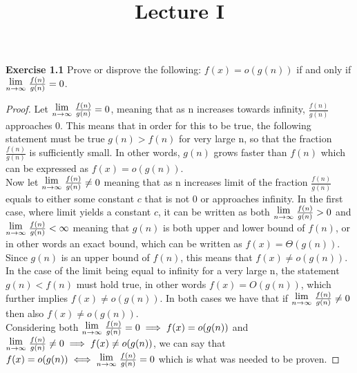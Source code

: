 \documentclass[a4paper]{article}
\title{\vspace{-2cm}Lecture I\vspace{-2cm}}
\date{}
\newcommand{\Lim}[1]{\raisebox{0.5ex}{{$\displaystyle \lim_{#1}\;$}}}
\begin{document}
\maketitle
\noindent \textbf{Exercise 1.1} Prove or disprove the following: $f(x) = o(g(n))$ if and only if $\Lim{n \to \infty} \frac{f(n)}{g(n)}=0$.
\begin{proof}
Let $\Lim{n \to \infty} \frac{f(n)}{g(n)}=0$, meaning that as n increases towards infinity, $\frac{f(n)}{g(n)}$ approaches 0. This means that in order for this to be true, the following statement must be true $g(n) > f(n)$ for very large n, so that the fraction $\frac{f(n)}{g(n)}$ is sufficiently small. In other words, $g(n)$ grows faster than $f(n)$ which can be expressed as $f(x) = o(g(n))$. \\
  
Now let $\Lim{n \to \infty} \frac{f(n)}{g(n)}\neq0$ meaning that as n increases limit of the fraction $\frac{f(n)}{g(n)}$ equals to either some constant $c$ that is not 0 or approaches infinity. In the first case, where limit yields a constant $c$, it can be written as both $\Lim{n \to \infty} \frac{f(n)}{g(n)}>0$ and $\Lim{n \to \infty} \frac{f(n)}{g(n)}<\infty$ meaning that $g(n)$ is both upper and lower bound of $f(n)$, or in other words an exact bound, which can be written as $f(x) = \Theta(g(n))$. Since $g(n)$ is an upper bound of $f(n)$, this means that $f(x) \neq o(g(n))$. In the case of the limit being equal to infinity for a very large n, the statement $g(n) < f(n)$ must hold true, in other words $f(x) = O(g(n))$, which further implies $f(x) \neq o(g(n))$. In both cases we have that if $\Lim{n \to \infty} \frac{f(n)}{g(n)}\neq0$ then also $f(x) \neq o(g(n))$. \\
  
Considering both $\Lim{n \to \infty} \frac{f(n)}{g(n)}=0 \implies f(x) = o(g(n))$ and $\Lim{n \to \infty} \frac{f(n)}{g(n)}\neq0 \implies f(x) \neq o(g(n))$, we can say that $f(x) = o(g(n)) \iff \Lim{n \to \infty} \frac{f(n)}{g(n)}=0$ which is what was needed to be proven.

\end{proof}
\end{document}
